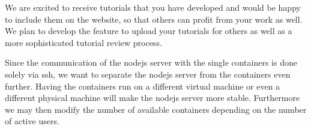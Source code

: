 \documentclass[]{article}
\begin{document}
We are excited to receive tutorials that you have developed and would be happy
to include them on the website, so that others can profit from your work as
well. We plan to develop the feature to upload your tutorials for others as
well as a more sophisticated tutorial review process. 

Since the communication of the nodejs server with the single containers is done
solely via ssh, we want to separate the nodejs server from the containers even
further. Having the containers run on a different virtual machine or even a
different physical machine will make the nodejs server more stable. Furthermore
we may then modify the number of available containers depending on the number
of active users.




\end{document}

